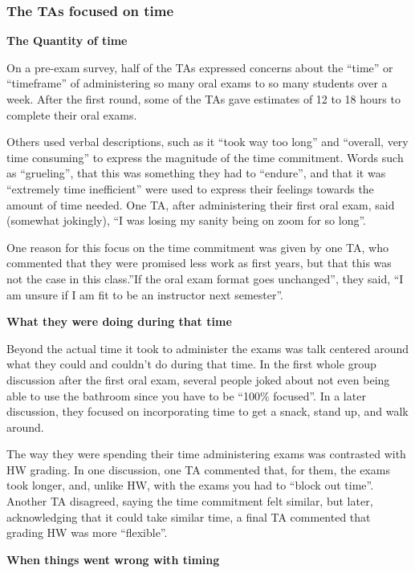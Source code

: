 \documentclass[
  letterpaper,
  DIV=11,
  numbers=noendperiod]{scrartcl}
\begin{document}
\hypertarget{the-tas-focused-on-time}{%
\subsubsection{The TAs focused on time}\label{the-tas-focused-on-time}}

\textbf{The Quantity of time}

On a pre-exam survey, half of the TAs expressed concerns about the
``time'' or ``timeframe'' of administering so many oral exams to so many
students over a week. After the first round, some of the TAs gave
estimates of 12 to 18 hours to complete their oral exams.

Others used verbal descriptions, such as it ``took way too long'' and
``overall, very time consuming'' to express the magnitude of the time
commitment. Words such as ``grueling'', that this was something they had
to ``endure'', and that it was ``extremely time inefficient'' were used
to express their feelings towards the amount of time needed. One TA,
after administering their first oral exam, said (somewhat jokingly), ``I
was losing my sanity being on zoom for so long''.

One reason for this focus on the time commitment was given by one TA,
who commented that they were promised less work as first years, but that
this was not the case in this class.''If the oral exam format goes
unchanged'', they said, ``I am unsure if I am fit to be an instructor
next semester''.

\textbf{What they were doing during that time}

Beyond the actual time it took to administer the exams was talk centered
around what they could and couldn't do during that time. In the first
whole group discussion after the first oral exam, several people joked
about not even being able to use the bathroom since you have to be
``100\% focused''. In a later discussion, they focused on incorporating
time to get a snack, stand up, and walk around.

The way they were spending their time administering exams was contrasted
with HW grading. In one discussion, one TA commented that, for them, the
exams took longer, and, unlike HW, with the exams you had to ``block out
time''. Another TA disagreed, saying the time commitment felt similar,
but later, acknowledging that it could take similar time, a final TA
commented that grading HW was more ``flexible''.

\textbf{When things went wrong with timing}
\end{document}
